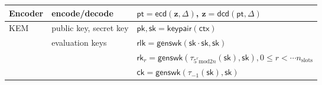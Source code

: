 \documentclass[preview]{standalone}
\begin{document}
\begin{table}
\begin{tabular}{|l|l|l|}
\hline
Encoder                           &encode/decode                         &$\mathsf{pt}=\mathsf{ecd}(\bm{z},\Delta)$, $\bm{z}=\mathsf{dcd}(\mathsf{pt},\Delta)$\\
\hline
\multirow{4}{*}{KEM}              &public key, secret key                &$\mathsf{pk,sk}=\mathsf{keypair}(\mathsf{ctx})$\\
                                  \cline{2-3}
                                  &\multirow{3}{*}{evaluation keys}      &$\mathsf{rlk}=\mathsf{genswk}(\mathsf{sk}\cdot\mathsf{sk},\mathsf{sk})$\\
                                  &                                      &$\mathsf{rk}_r=\mathsf{genswk}(\tau_{5^r\text{mod}2n}(\mathsf{sk}),\mathsf{sk}),0\leq r<\cdots n_{\text{slots}}$\\
                                  &                                      &$\mathsf{ck}=\mathsf{genswk}(\tau_{-1}(\mathsf{sk}),\mathsf{sk})$\\
\hline
\end{tabular}
\end{table}
\end{document}
